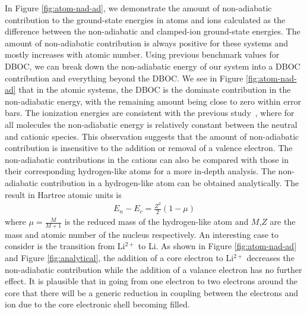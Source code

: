 \documentclass[pra,superscriptaddress,groupedaddress,twocolumn]{revtex4-1}
\begin{document}
In Figure \ref{fig:atom-nad-ad}, we demonstrate the amount of non-adiabatic contribution to the ground-state energies in atoms and ions calculated as the difference between the non-adiabatic and clamped-ion ground-state energies. The amount of non-adiabatic contribution is always positive for these systems and mostly increases with atomic number. Using previous benchmark values for DBOC, we can break down the non-adiabatic energy of our system into a DBOC contribution and everything beyond the DBOC. We see in Figure \ref{fig:atom-nad-ad} that in the atomic systems, the DBOC is the dominate contribution in the non-adiabatic energy, with the remaining amount being close to zero within error bars. The ionization energies are consistent with the previous study~\cite{Klopper_IP}, where for all molecules the non-adiabatic energy is relatively constant between the neutral and cationic species. This observation suggests that the amount of non-adiabatic contribution is insensitive to the addition or removal of a valence electron. The non-adiabatic contributions in the cations can also be compared with those in their corresponding hydrogen-like atoms for a more in-depth analysis. The non-adiabatic contribution in a hydrogen-like atom can be obtained analytically. The result in Hartree atomic units is
\begin{align}
E_n-E_c=\frac{Z^2}{2}(1-\mu)
\end{align}
where $\mu=\frac{M}{M+1}$ is the reduced mass of the hydrogen-like atom and $M$,$Z$ are the mass and atomic number of the nucleus respectively. An interesting case to consider is the transition from Li$^{2+}$ to Li. As shown in Figure \ref{fig:atom-nad-ad} and Figure \ref{fig:analytical}, the addition of a core electron to Li$^{2+}$ decreases the non-adiabatic contribution while the addition of a valance electron has no further effect.
It is plausible that in going from one electron to two electrons 
around the core that there will be a generic reduction in coupling between the electrons 
and ion due to the core electronic shell becoming filled.

\end{document}
